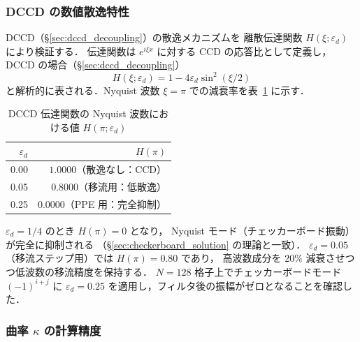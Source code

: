\subsubsection{DCCD の数値散逸特性}
\label{sec:verify_dccd_dissipation}

DCCD（§\ref{sec:dccd_decoupling}）の散逸メカニズムを
離散伝達関数 $H(\xi; \varepsilon_d)$ により検証する．
伝達関数は $e^{i\xi x}$ に対する CCD の応答比として定義し，
DCCD の場合（§\ref{sec:dccd_decoupling}）
\begin{equation}
  H(\xi; \varepsilon_d) = 1 - 4\varepsilon_d \sin^2(\xi/2)
  \label{eq:dccd_transfer_verify}
\end{equation}
と解析的に表される．Nyquist 波数 $\xi = \pi$ での減衰率を表~\ref{tab:dccd_transfer} に示す．

\begin{table}[htbp]
\centering
\caption{DCCD 伝達関数の Nyquist 波数における値 $H(\pi; \varepsilon_d)$}
\label{tab:dccd_transfer}
\begin{tabular}{rr}
\toprule
$\varepsilon_d$ & $H(\pi)$ \\
\midrule
0.00 & $1.0000$（散逸なし：CCD）\\
0.05 & $0.8000$（移流用：低散逸）\\
0.25 & $0.0000$（PPE 用：完全抑制）\\
\bottomrule
\end{tabular}
\end{table}

$\varepsilon_d = 1/4$ のとき $H(\pi) = 0$ となり，
Nyquist モード（チェッカーボード振動）が完全に抑制される
（§\ref{sec:checkerboard_solution} の理論と一致）．
$\varepsilon_d = 0.05$（移流ステップ用）では $H(\pi) = 0.80$ であり，
高波数成分を 20\% 減衰させつつ低波数の移流精度を保持する．
$N = 128$ 格子上でチェッカーボードモード $(-1)^{i+j}$ に
$\varepsilon_d = 0.25$ を適用し，フィルタ後の振幅がゼロとなることを確認した．

\subsubsection{\texorpdfstring{曲率 $\kappa$ の計算精度}{曲率 κ の計算精度}}
\label{sec:verify_curvature}

